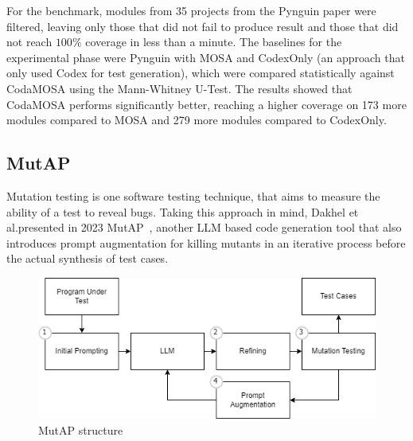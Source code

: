 \documentclass[%
  chapterprefix=false,%
  open=right,%
  twoside=true,%
  paper=a4,%
  logofile={Figures/logo.png},%
  thesistype=master,%
  UKenglish,%
]{se2thesis}
\begin{document}
For the benchmark, modules from 35 projects from the Pynguin paper were filtered, leaving only those that did not fail to produce result and those that did not reach \(100\%\) coverage in less than a minute.
The baselines for the experimental phase were Pynguin with MOSA and CodexOnly (an approach that only used Codex for test generation), which were compared statistically against CodaMOSA using the Mann-Whitney U-Test.
The results showed that CodaMOSA performs significantly better, reaching a higher coverage on 173 more modules compared to MOSA and 279 more modules compared to CodexOnly.

\subsection*{MutAP}

Mutation testing is one software testing technique, that aims to measure the ability of a test to reveal bugs.
Taking this approach in mind, Dakhel et al.\@ presented in 2023 MutAP~\cite{DBLP:journals/corr/abs-2308-16557}, another LLM based code generation tool that also introduces prompt augmentation for killing mutants in an iterative process before the actual synthesis of test cases.

\begin{figure}[tb]
  \centering 
  \includegraphics[width=.99\textwidth]{Figures/mutap.png}
  \caption{MutAP structure}\label{fig:mutap}
\end{figure}
\end{document}
